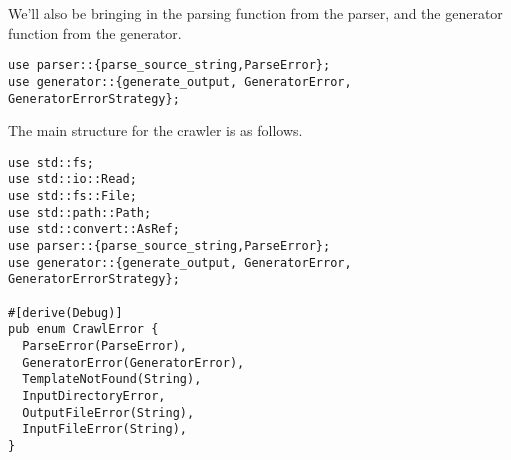 \documentclass[11pt]{article}
\begin{document}
We'll also be bringing in the parsing function from the parser, and the generator function from the generator.
\begin{verbatim}
use parser::{parse_source_string,ParseError};
use generator::{generate_output, GeneratorError, GeneratorErrorStrategy};
\end{verbatim}

The main structure for the crawler is as follows.
\begin{verbatim}
use std::fs;
use std::io::Read;
use std::fs::File;
use std::path::Path;
use std::convert::AsRef;
use parser::{parse_source_string,ParseError};
use generator::{generate_output, GeneratorError, GeneratorErrorStrategy};

#[derive(Debug)]
pub enum CrawlError {
  ParseError(ParseError),
  GeneratorError(GeneratorError),
  TemplateNotFound(String),
  InputDirectoryError,
  OutputFileError(String),
  InputFileError(String),
}


\end{verbatim}
\end{document}
